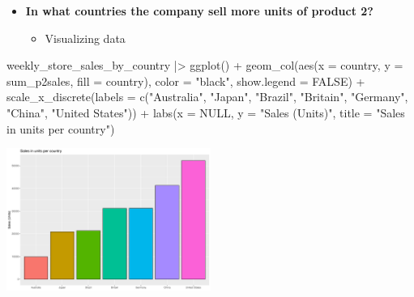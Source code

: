 \documentclass[
  ignorenonframetext,
]{beamer}
\newenvironment{Shaded}{\begin{snugshade}}{\end{snugshade}}
\newcommand{\AttributeTok}[1]{\textcolor[rgb]{0.40,0.45,0.13}{#1}}
\newcommand{\ConstantTok}[1]{\textcolor[rgb]{0.56,0.35,0.01}{#1}}
\newcommand{\FunctionTok}[1]{\textcolor[rgb]{0.28,0.35,0.67}{#1}}
\newcommand{\NormalTok}[1]{\textcolor[rgb]{0.00,0.23,0.31}{#1}}
\newcommand{\SpecialCharTok}[1]{\textcolor[rgb]{0.37,0.37,0.37}{#1}}
\newcommand{\StringTok}[1]{\textcolor[rgb]{0.13,0.47,0.30}{#1}}
\providecommand{\tightlist}{%
  \setlength{\itemsep}{0pt}\setlength{\parskip}{0pt}}\usepackage{longtable,booktabs,array}
\begin{document}
\begin{frame}[fragile]{}
\label{section-35}
\begin{itemize}
\item
  \textbf{In what countries the company sell more units of product 2?}

  \begin{itemize}
  \tightlist
  \item
    Visualizing data
  \end{itemize}
\end{itemize}

\tiny

\begin{Shaded}
\begin{Highlighting}[]
\NormalTok{weekly\_store\_sales\_by\_country }\SpecialCharTok{|\textgreater{}} \FunctionTok{ggplot}\NormalTok{() }\SpecialCharTok{+} 
  \FunctionTok{geom\_col}\NormalTok{(}\FunctionTok{aes}\NormalTok{(}\AttributeTok{x =}\NormalTok{ country, }\AttributeTok{y =}\NormalTok{ sum\_p2sales, }\AttributeTok{fill =}\NormalTok{ country),}
           \AttributeTok{color =} \StringTok{"black"}\NormalTok{, }\AttributeTok{show.legend =} \ConstantTok{FALSE}\NormalTok{) }\SpecialCharTok{+}
  \FunctionTok{scale\_x\_discrete}\NormalTok{(}\AttributeTok{labels =} \FunctionTok{c}\NormalTok{(}\StringTok{"Australia"}\NormalTok{, }\StringTok{"Japan"}\NormalTok{, }\StringTok{"Brazil"}\NormalTok{, }
                              \StringTok{"Britain"}\NormalTok{, }\StringTok{"Germany"}\NormalTok{, }\StringTok{"China"}\NormalTok{, }\StringTok{"United States"}\NormalTok{)) }\SpecialCharTok{+}
  \FunctionTok{labs}\NormalTok{(}\AttributeTok{x =} \ConstantTok{NULL}\NormalTok{, }\AttributeTok{y =} \StringTok{"Sales (Units)"}\NormalTok{,}
       \AttributeTok{title =} \StringTok{"Sales in units per country"}\NormalTok{)}
\end{Highlighting}
\end{Shaded}

\begin{center}
\includegraphics[width=0.5\textwidth,height=\textheight]{003_describing_data_files/figure-beamer/unnamed-chunk-34-1.pdf}
\end{center}
\end{frame}
\end{document}
